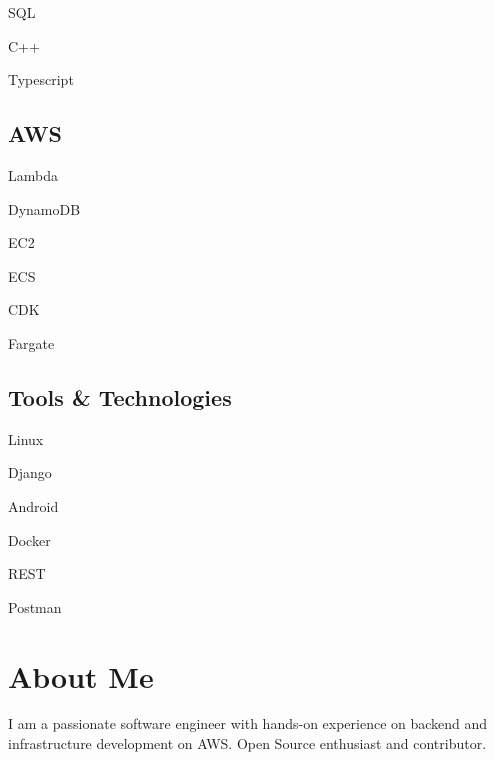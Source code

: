 \documentclass[]{resume}
\begin{document}
\begin{minipage}[t]{0.25\textwidth}
\begin{itemize*}
 \item SQL
 \item C++
 \item Typescript
\end{itemize*}
\subsectionsep

\subsection{AWS}
\begin{itemize*}
 \item Lambda
 \item DynamoDB
 \item EC2
 \item ECS
 \item CDK
 \item Fargate
\end{itemize*}
\subsectionsep

\subsection{Tools \& Technologies}
\begin{itemize*}
 \item Linux
 \item Django
 \item Android
 \item Docker
 \item REST
 \item Postman
\end{itemize*}
\secondarysectionsep

\section{About Me}
\noindent \RaggedRight \normalfont
I am a passionate software engineer with hands-on experience on backend and
infrastructure development on AWS. Open Source enthusiast and contributor.

%
%

\end{minipage}
\hfill
\end{document}
